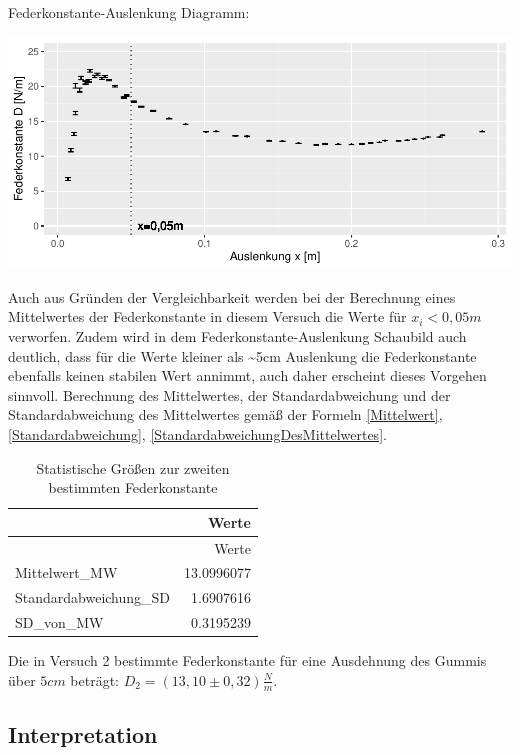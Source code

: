\documentclass[
  9pt,
]{article}
\begin{document}
Federkonstante-Auslenkung Diagramm:

\begin{center}\includegraphics{DehnbareStoffe_files/figure-latex/unnamed-chunk-15-1} \end{center}

Auch aus Gründen der Vergleichbarkeit werden bei der Berechnung eines
Mittelwertes der Federkonstante in diesem Versuch die Werte für
\(x_i<0,05m\) verworfen. Zudem wird in dem Federkonstante-Auslenkung
Schaubild auch deutlich, dass für die Werte kleiner als
\textasciitilde5cm Auslenkung die Federkonstante ebenfalls keinen
stabilen Wert annimmt, auch daher erscheint dieses Vorgehen sinnvoll.
Berechnung des Mittelwertes, der Standardabweichung und der
Standardabweichung des Mittelwertes gemäß der Formeln \ref{Mittelwert},
\ref{Standardabweichung}, \ref{StandardabweichungDesMittelwertes}.

\begin{longtable}[]{@{}lr@{}}
\caption{Statistische Größen zur zweiten bestimmten
Federkonstante}\tabularnewline
\toprule()
& Werte \\
\midrule()
\endfirsthead
\toprule()
& Werte \\
\midrule()
\endhead
Mittelwert\_MW & 13.0996077 \\
Standardabweichung\_SD & 1.6907616 \\
SD\_von\_MW & 0.3195239 \\
\bottomrule()
\end{longtable}

Die in Versuch 2 bestimmte Federkonstante für eine Ausdehnung des Gummis
über \(5cm\) beträgt: \(D_2=(13,10 \pm 0,32)\frac{N}{m}\).

\hypertarget{interpretation}{%
\subsection{Interpretation}\label{interpretation}}
\end{document}
